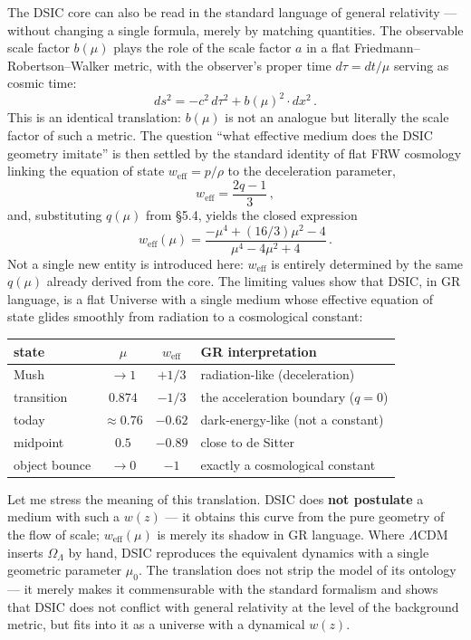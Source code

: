 \documentclass{article}
\begin{document}
The DSIC core can also be read in the standard language of general relativity --- without changing a single formula, merely by matching quantities. The observable scale factor $b(\mu)$ plays the role of the scale factor $a$ in a flat Friedmann--Robertson--Walker metric, with the observer's proper time $d\tau = dt/\mu$ serving as cosmic time:
\begin{equation}
ds^2 = -c^2\, d\tau^2 + b(\mu)^2 \cdot dx^2\,.
\end{equation}
This is an identical translation: $b(\mu)$ is not an analogue but literally the scale factor of such a metric. The question ``what effective medium does the DSIC geometry imitate'' is then settled by the standard identity of flat FRW cosmology linking the equation of state $w_{\text{eff}} = p/\rho$ to the deceleration parameter,
\begin{equation}
w_{\text{eff}} = \frac{2q - 1}{3}\,,
\end{equation}
and, substituting $q(\mu)$ from \S5.4, yields the closed expression
\begin{equation}
w_{\text{eff}}(\mu) = \frac{-\mu^4 + (16/3)\mu^2 - 4}{\mu^4 - 4\mu^2 + 4}\,.
\end{equation}
Not a single new entity is introduced here: $w_{\text{eff}}$ is entirely determined by the same $q(\mu)$ already derived from the core. The limiting values show that DSIC, in GR language, is a flat Universe with a single medium whose effective equation of state glides smoothly from radiation to a cosmological constant:

\begin{table}[htbp]
\centering
\small
\begin{tabular}{@{}lccl@{}}
\toprule
\textbf{state} & $\mu$ & $w_{\text{eff}}$ & \textbf{GR interpretation} \\
\midrule
Mush & $\to 1$ & $+1/3$ & radiation-like (deceleration) \\
transition & $0.874$ & $-1/3$ & the acceleration boundary ($q = 0$) \\
today & $\approx 0.76$ & $-0.62$ & dark-energy-like (not a constant) \\
midpoint & $0.5$ & $-0.89$ & close to de Sitter \\
object bounce & $\to 0$ & $-1$ & exactly a cosmological constant \\
\bottomrule
\end{tabular}
\end{table}

Let me stress the meaning of this translation. DSIC does \textbf{not postulate} a medium with such a $w(z)$ --- it obtains this curve from the pure geometry of the flow of scale; $w_{\text{eff}}(\mu)$ is merely its shadow in GR language. Where $\Lambda$CDM inserts $\Omega_\Lambda$ by hand, DSIC reproduces the equivalent dynamics with a single geometric parameter $\mu_0$. The translation does not strip the model of its ontology --- it merely makes it commensurable with the standard formalism and shows that DSIC does not conflict with general relativity at the level of the background metric, but fits into it as a universe with a dynamical $w(z)$.
\end{document}
